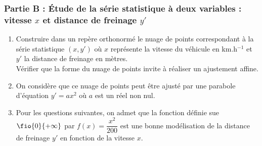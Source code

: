 \documentclass[a4paper,11pt,exos]{nsi} %
\begin{document}
\subsubsection*{Partie B : Étude de la série statistique à deux variables : vitesse $x$ et distance de freinage $y'$}
\begin{enumerate}
    \item Construire dans un repère orthonormé le nuage de points correspondant à la série statistique $(x,y')$ où $x$ représente la vitesse du véhicule en km.h$^{-1}$ et $y'$ la distance de freinage en mètres.\\
    Vérifier que la forme du nuage de points invite à réaliser un ajustement affine.
    \item On considère que ce nuage de points peut être ajusté par une parabole d'équation $y' = ax^2$ où $a$ est un réel non nul.
    \item Pour les questions suivantes, on admet que la fonction définie sue $\fio{0}{+\infty}$ par $f(x)=\dfrac{x^2}{200}$ est une bonne modélisation de la distance de freinage $y'$ en fonction de la vitesse $x$.
\end{enumerate}
\end{document}
